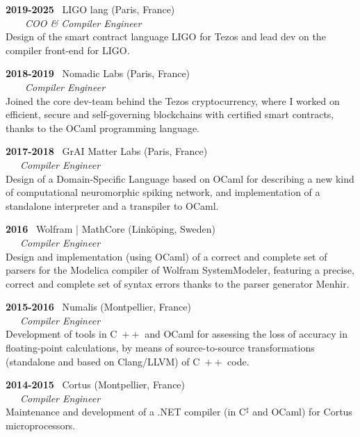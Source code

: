 \documentclass[a4paper,11pt]{article}
\newcommand{\cpp}{\mbox{C \hspace*{-2.5mm} \raise 0.7mm \hbox{${\scriptscriptstyle ++}$}}}
\begin{document}
\bigskip

\noindent\textbf{2019-2025} \ \textsf{LIGO lang} (Paris,
France)\\ \ \ \ \ \emph{COO \& Compiler Engineer}\\
Design of the smart contract language LIGO for Tezos and lead dev
on the compiler front-end for LIGO.

\bigskip

\noindent\textbf{2018-2019} \ \textsf{Nomadic Labs} (Paris,
  France)\\ \ \ \ \ \emph{Compiler Engineer}\\ Joined the core
  dev-team behind the Tezos cryptocurrency, where I worked on
  efficient, secure and self-governing blockchains with certified
  smart contracts, thanks to the OCaml programming language.

\bigskip

\noindent\textbf{2017-2018} \ \textsf{GrAI Matter Labs} (Paris,
France)\\ \ \ \ \emph{Compiler Engineer}\\ Design of a Domain-Specific
Language based on OCaml for describing a new kind of computational
neuromorphic spiking network, and implementation of a standalone
interpreter and a transpiler to OCaml.

\newpage

\noindent\textbf{2016} \ \textsf{Wolfram | MathCore}
(Link\"oping, Sweden)\\ \ \ \ \emph{Compiler Engineer}\\ Design and
implementation (using OCaml) of a correct and complete set of parsers
for the Modelica compiler of Wolfram SystemModeler, featuring a
precise, correct and complete set of syntax errors thanks to the
parser generator Menhir.

\bigskip

\noindent\textbf{2015-2016} \ \textsf{Numalis} (Montpellier,
France)\\ \ \ \ \emph{Compiler Engineer}\\ Development of tools in
\cpp{} and OCaml for assessing the loss of accuracy in floating-point
calculations, by means of source-to-source transformations (standalone
and based on Clang/LLVM) of \cpp{} code.

\bigskip

\noindent\textbf{2014-2015} \ \textsf{Cortus} (Montpellier,
France)\\ \ \ \ \emph{Compiler Engineer}\\ Maintenance and development
of a .NET compiler (in C$^\sharp$ and OCaml) for \textsf{Cortus}
microprocessors.
\end{document}
